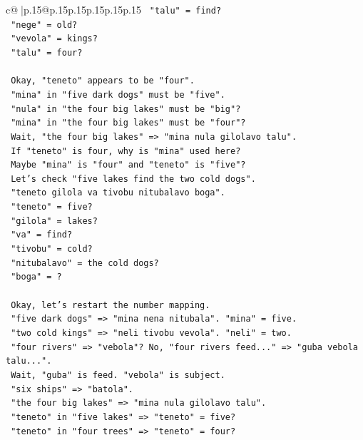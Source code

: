\documentclass{article}
\begin{document}
{\begin{supertabular}{c@{$\;$}|p{.15\linewidth}@{}p{.15\linewidth}p{.15\linewidth}p{.15\linewidth}p{.15\linewidth}p{.15\linewidth}}
{{{\texttt{   "talu" = find?} \\
\texttt{   "nege" = old?} \\
\texttt{   "vevola" = kings?} \\
\texttt{   "talu" = four?} \\
\\ 
\texttt{   Okay, "teneto" appears to be "four".} \\
\texttt{   "mina" in "five dark dogs" must be "five".} \\
\texttt{   "nula" in "the four big lakes" must be "big"?} \\
\texttt{   "mina" in "the four big lakes" must be "four"?} \\
\texttt{   Wait, "the four big lakes" => "mina nula gilolavo talu".} \\
\texttt{   If "teneto" is four, why is "mina" used here?} \\
\texttt{   Maybe "mina" is "four" and "teneto" is "five"?} \\
\texttt{   Let's check "five lakes find the two cold dogs".} \\
\texttt{   "teneto gilola va tivobu nitubalavo boga".} \\
\texttt{   "teneto" = five?} \\
\texttt{   "gilola" = lakes?} \\
\texttt{   "va" = find?} \\
\texttt{   "tivobu" = cold?} \\
\texttt{   "nitubalavo" = the cold dogs?} \\
\texttt{   "boga" = ?} \\
\\ 
\texttt{   Okay, let's restart the number mapping.} \\
\texttt{   "five dark dogs" => "mina nena nitubala". "mina" = five.} \\
\texttt{   "two cold kings" => "neli tivobu vevola". "neli" = two.} \\
\texttt{   "four rivers" => "vebola"? No, "four rivers feed..." => "guba vebola talu...".} \\
\texttt{   Wait, "guba" is feed. "vebola" is subject.} \\
\texttt{   "six ships" => "batola".} \\
\texttt{   "the four big lakes" => "mina nula gilolavo talu".} \\
\texttt{   "teneto" in "five lakes" => "teneto" = five?} \\
\texttt{   "teneto" in "four trees" => "teneto" = four?} \\
}}}
\end{supertabular}}
\end{document}
